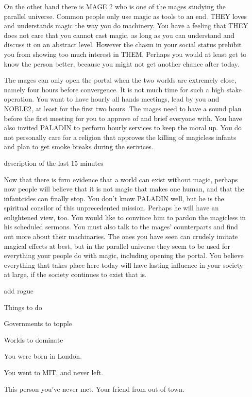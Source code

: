 \documentclass[char]{guildcamp3}
\begin{document}
On the other hand there is MAGE 2 who is one of the mages studying the parallel universe. Common people only use magic as tools to an end. THEY loves and understands magic the way you do machinery. You have a feeling that THEY does not care that you cannot cast magic, as long as you can understand and discuss it on an abstract level. However the chasm in your social status prehibit you from showing too much interest in THEM. Perhaps you would at least get to know the person better, because you might not get another chance after today.

The mages can only open the portal when the two worlds are extremely close, namely four hours before convergence. It is not much time for such a high stake operation. You want to have hourly all hands meetings, lead by you and NOBLE2, at least for the first two hours. The mages need to have a sound plan before the first meeting for you to approve of and brief everyone with. You have also invited PALADIN to perform hourly services to keep the moral up. You do not personally care for a religion that approves the killing of magicless infants and plan to get smoke breaks during the serivices.

description of the last 15 minutes 

Now that there is firm evidence that a world can exist without magic, perhaps now people will believe that it is not magic that makes one human, and that the infantcides can finally stop. You don't know PALADIN well, but he is the spiritual consilor of this unprecedented mission. Perhaps he will have an enlightened view, too. You would like to convince him to pardon the magicless in his scheduled sermons. You must also talk to the mages' counterparts and find out more about their machinaries. The ones you have seen can crudely imitate magical effects at best, but in the parallel universe they seem to be used for everything your people do with magic, including opening the portal. You believe everything that takes place here today will have lasting influence in your society at large, if the society continues to exist that is.

add rogue


\begin{itemz}[Goals]
  \item Things to do
  \item Governments to topple
  \item Worlds to dominate
\end{itemz}

\begin{itemz}[Notes]
  \item You were born in London.
  \item You went to MIT, and never left.
\end{itemz}


\begin{contacts}
  \contact{\cNPC{}} This person you've never met.
  \contact{\cSomeGuy{}} Your friend from out of town.
\end{contacts}
\end{document}
